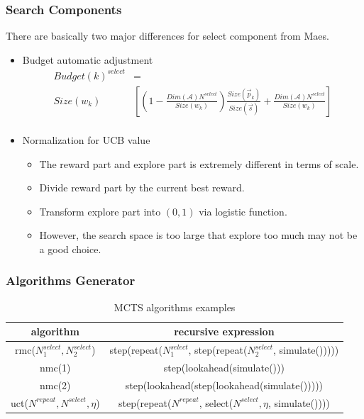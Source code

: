 \documentclass[compress]{beamer}
\begin{document}
\begin{frame}
\frametitle{Search Components}
There are basically two major differences for select component from Maes.
\begin{itemize}
  \item Budget automatic adjustment
    \begin{equation}
    \begin{aligned}
      Budget(k)^{select} & = \\
      Size(w_{k}) & [(1 - \frac{Dim(\mathcal{A}) N^{select}}{Size(w_{k})}) \frac{Size(\vec p_{k})}{Size(\vec s)} + \frac{Dim(\mathcal{A}) N^{select}}{Size(w_{k})}] \\ 
    \end{aligned}
    \end{equation}
  \item Normalization for UCB value \\
    \begin{itemize}
      \item The reward part and explore part is extremely different in terms of scale.
      \item Divide reward part by the current best reward.
      \item Transform explore part into $(0,1)$ via logistic function.
      \item {\color{red}However, the search space is too large that explore too much may not be a good choice.}
    \end{itemize}
\end{itemize}
\end{frame}

\begin{frame}
\frametitle{Algorithms Generator}
\begin{table}[htbp]
  \centering
  \scriptsize
  \caption{MCTS algorithms examples}
    \begin{tabular}{cc}
    \toprule
    algorithm & recursive expression\\
    \midrule
    rmc($N_{1}^{select}, N_{2}^{select}$) & step(repeat($N_{1}^{select}$, step(repeat($N_{2}^{select}$, simulate()))))\\
    nmc(1) & step(lookahead(simulate())) \\
    nmc(2) & step(lookahead(step(lookahead(simulate())))) \\
    uct($N^{repeat}, N^{select}, \eta$) & step(repeat($N^{repeat}$, select($N^{select}, \eta$, simulate())))\\
    \bottomrule
    \end{tabular}%
  \label{tab:algo_examples}%
\end{table}%
\end{frame}
\end{document}
